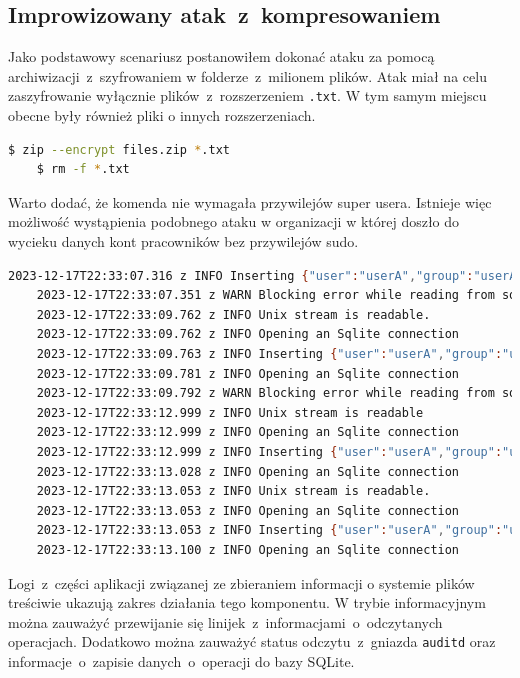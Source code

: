\subsection{Improwizowany atak~z~kompresowaniem}
Jako podstawowy scenariusz postanowiłem dokonać ataku za pomocą archiwizacji~z~szyfrowaniem w folderze~z~milionem plików. Atak miał na celu zaszyfrowanie wyłącznie plików~z~rozszerzeniem \texttt{.txt}. W tym samym miejscu obecne były również pliki o innych rozszerzeniach.
\begin{lstlisting}[language=bash,
    backgroundcolor=\color{EEGold!5!white},
    caption={Komenda użyta do wykonania "ataku".},
    label={lst:commau}]
    $ zip --encrypt files.zip *.txt
    $ rm -f *.txt
\end{lstlisting}
Warto dodać, że komenda nie wymagała przywilejów super usera. Istnieje więc możliwość wystąpienia podobnego ataku w organizacji w której doszło do wycieku danych kont pracowników bez przywilejów sudo.
\begin{lstlisting}[language=bash,
    backgroundcolor=\color{EEGold!5!white},
    caption={Fragment logów~z~komponentu zbierającego informacje o systemie plików.},
    label={lst:logau}]
    2023-12-17T22:33:07.316 z INFO Inserting {"user":"userA","group":"userA","executable":"/usr/bin/rm","syscall":"unlinkat","timestamp":"1702852387","key":"WRITE"}
    2023-12-17T22:33:07.351 z WARN Blocking error while reading from socket
    2023-12-17T22:33:09.762 z INFO Unix stream is readable.
    2023-12-17T22:33:09.762 z INFO Opening an Sqlite connection
    2023-12-17T22:33:09.763 z INFO Inserting {"user":"userA","group":"userA","executable":"/usr/bin/bash","syscall":"openat","timestamp":"1702852389","key":"READ"}
    2023-12-17T22:33:09.781 z INFO Opening an Sqlite connection
    2023-12-17T22:33:09.792 z WARN Blocking error while reading from socket
    2023-12-17T22:33:12.999 z INFO Unix stream is readable
    2023-12-17T22:33:12.999 z INFO Opening an Sqlite connection
    2023-12-17T22:33:12.999 z INFO Inserting {"user":"userA","group":"userA","executable":"/usr/bin/zip","syscall":"openat","timestamp":"1702852392","key":"WRITE"}
    2023-12-17T22:33:13.028 z INFO Opening an Sqlite connection
    2023-12-17T22:33:13.053 z INFO Unix stream is readable.
    2023-12-17T22:33:13.053 z INFO Opening an Sqlite connection
    2023-12-17T22:33:13.053 z INFO Inserting {"user":"userA","group":"userA","executable":"/usr/bin/zip","syscall":"unlink","timestamp":"1702852393","key":"WRITE"}
    2023-12-17T22:33:13.100 z INFO Opening an Sqlite connection
\end{lstlisting}
Logi~z~części aplikacji związanej ze zbieraniem informacji o systemie plików treściwie ukazują zakres działania tego komponentu. W trybie informacyjnym można zauważyć przewijanie się linijek~z~informacjami~o~odczytanych operacjach. Dodatkowo można zauważyć status odczytu~z~gniazda \texttt{auditd} oraz informacje~o~zapisie danych~o~operacji do bazy SQLite.\newpage

